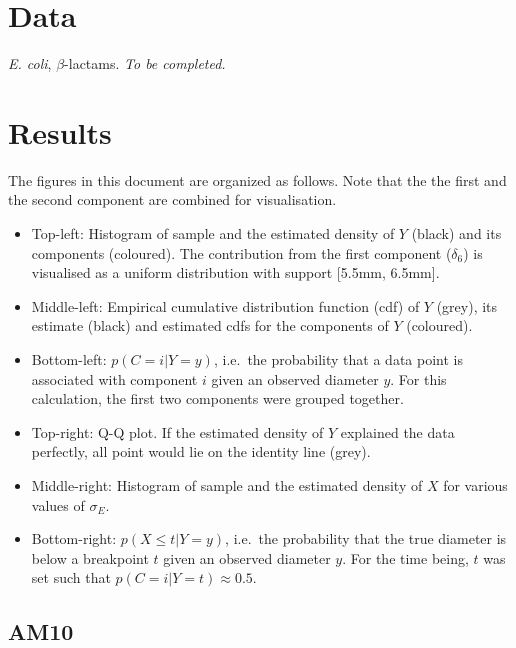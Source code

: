 \documentclass[]{article}
\begin{document}
\section{Data}\label{data}

\emph{E. coli}, \(\beta\)-lactams. \emph{To be completed.}

\section{Results}\label{results}

The figures in this document are organized as follows. Note that the the
first and the second component are combined for visualisation.

\begin{itemize}
\itemsep1pt\parskip0pt
\item
  Top-left: Histogram of sample and the estimated density of \(Y\)
  (black) and its components (coloured). The contribution from the first
  component (\(\delta_6\)) is visualised as a uniform distribution with
  support {[}5.5\hspace{3pt}mm, 6.5\hspace{3pt}mm{]}.
\item
  Middle-left: Empirical cumulative distribution function (cdf) of \(Y\)
  (grey), its estimate (black) and estimated cdfs for the components of
  \(Y\) (coloured).
\item
  Bottom-left: \(p(C=i|Y=y)\), i.e.~the probability that a data point is
  associated with component \(i\) given an observed diameter \(y\). For
  this calculation, the first two components were grouped together.
\item
  Top-right: Q-Q plot. If the estimated density of \(Y\) explained the
  data perfectly, all point would lie on the identity line (grey).
\item
  Middle-right: Histogram of sample and the estimated density of \(X\)
  for various values of \(\sigma_E\).
\item
  Bottom-right: \(p(X\leq t|Y=y)\), i.e.~the probability that the true
  diameter is below a breakpoint \(t\) given an observed diameter \(y\).
  For the time being, \(t\) was set such that \(p(C=i|Y=t)\approx0.5\).
\end{itemize}

\pagebreak

\subsection{AM10}\label{am10}
\end{document}
